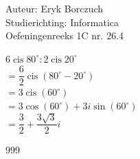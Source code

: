 \documentclass[a4paper]{article}
\begin{document}
  
\noindent \large Auteur: Eryk Borczuch \\
\noindent \large Studierichting: Informatica\\
\noindent \large Oefeningenreeks 1C nr. 26.4\\

\medskip

\normalsize

$6 \operatorname{cis}80^\circ : 2 \operatorname{cis}20^\circ$\\

$= \dfrac{6}{2} \operatorname{cis}\left(80^\circ - 20^\circ \right)$\\

$= 3 \operatorname{cis}\left(60^\circ \right) $\\

$= 3 \cos (60^\circ) + 3i \sin (60^\circ)$\\

$= \dfrac{3}{2} + \dfrac{3\sqrt{3}}{2}i$\\

\begin{thebibliography}{999}
\end{thebibliography}
\end{document}
